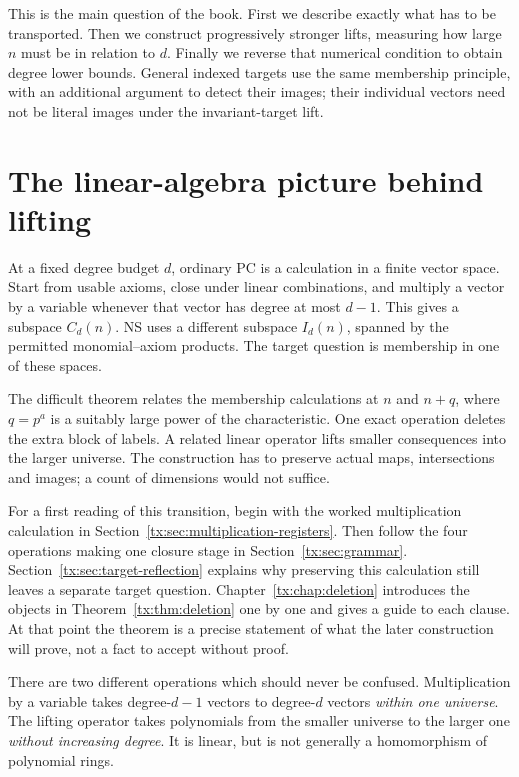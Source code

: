 This is the main question of the book. First we describe exactly
what has to be transported. Then we construct progressively stronger
lifts, measuring how large $n$ must be in relation to $d$. Finally
we reverse that numerical condition to obtain degree lower bounds.
General indexed targets use the same membership principle, with an
additional argument to detect their images; their individual vectors
need not be literal images under the invariant-target lift.

\section*{The linear-algebra picture behind lifting}
At a fixed degree budget $d$, ordinary PC is a calculation in a finite
vector space. Start from usable axioms, close under linear combinations,
and multiply a vector by a variable whenever that vector has degree at
most $d-1$. This gives a subspace $C_d(n)$. NS uses a different subspace
$I_d(n)$, spanned by the permitted monomial--axiom products. The target
question is membership in one of these spaces.

The difficult theorem relates the membership calculations at $n$ and
$n+q$, where $q=p^a$ is a suitably large power of the characteristic.
One exact operation deletes the extra block of labels. A related linear
operator lifts smaller consequences into the larger universe. The
construction has to preserve actual maps, intersections and images;
a count of dimensions would not suffice.

For a first reading of this transition, begin with the worked
multiplication calculation in Section~\ref{tx:sec:multiplication-registers}.
Then follow the four operations making one closure stage in
Section~\ref{tx:sec:grammar}. Section~\ref{tx:sec:target-reflection}
explains why preserving this calculation still leaves a separate
target question. Chapter~\ref{tx:chap:deletion} introduces the objects
in Theorem~\ref{tx:thm:deletion} one by one and gives a guide to each
clause. At that point the theorem is a precise statement of what
the later construction will prove, not a fact to accept without proof.

There are two different operations which should never be confused.
Multiplication by a variable takes degree-$d-1$ vectors to degree-$d$
vectors \emph{within one universe}. The lifting operator takes
polynomials from the smaller universe to the larger one \emph{without
increasing degree}. It is linear, but is not generally a homomorphism
of polynomial rings.

